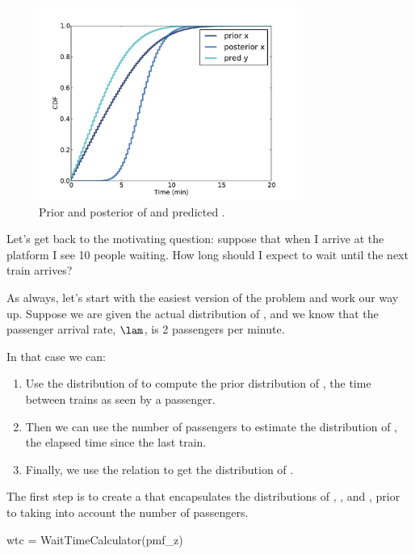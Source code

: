 \documentclass[12pt]{book}
\theoremstyle{exercise}
\begin{document}
\begin{figure}
\centerline{\includegraphics[height=2.5in]{figs/redline3.pdf}}
\caption{Prior and posterior of  and predicted . }
\label{fig.redline3}
\end{figure}

Let's get back to the motivating question: suppose that when
I arrive at the platform I see 10 people waiting.
How long should I expect to wait until the next train arrives?

As always, let's start with the easiest version of the problem
and work our way up.  Suppose we are given the actual distribution of
, and we know that the passenger arrival rate,
$\lam$, is 2 passengers per minute.

In that case we can:

\begin{enumerate}

\item Use the distribution of  to compute
the prior distribution of , the time between trains
as seen by a passenger.

\item Then we can use the number of passengers to estimate the distribution
of , the elapsed time since the last train.

\item Finally, we use the relation  to get the
distribution of .

\end{enumerate}

The first step is to create a  that
encapsulates the distributions of , ,
and , prior to taking into account the number of
passengers.

\begin{code}
    wtc = WaitTimeCalculator(pmf_z)
\end{code}
\end{document}
